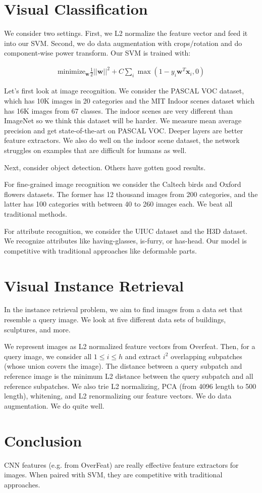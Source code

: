 \documentclass[a4paper]{article}
\begin{document}
\section{Visual Classification}
We consider two settings. First, we L2 normalize the feature vector and feed
it into our SVM. Second, we do data augmentation with crops/rotation and
do component-wise power transform. Our SVM is trained with:

\begin{align}
  \text{minimize}_{\bm{w}}{\frac{1}{2} ||\bm{w}||^2
  + C \sum_{i}{\max(1 - y_i \bm{w}^T \bm{x}_i, 0)}}
\end{align}

Let's first look at image recognition. We consider the PASCAL VOC dataset, which
has 10K images in 20 categories
and the MIT Indoor scenes dataset which has 16K images from 67 classes. The
indoor scenes are very different than ImageNet so we think this dataset will be
harder. We measure mean average precision and get state-of-the-art on PASCAL
VOC. Deeper layers are better feature extractors. We also do well on the indoor
scene dataset, the network struggles on examples that are difficult for humans
as well.

Next, consider object detection. Others have gotten good results.

For fine-grained image recognition we consider the Caltech birds and Oxford
flowers datasets. The former has 12 thousand images from 200 categories, and the
latter has 100 categories with between 40 to 260 images each. We beat all
traditional methods.

For attribute recognition, we consider the UIUC dataset and the H3D dataset. We
recognize attributes like having-glasses, is-furry, or has-head.
Our model is competitive with traditional approaches like deformable parts.

\section{Visual Instance Retrieval}
In the instance retrieval problem, we aim to find images from a data set that
resemble a query image. We look at five different data sets of buildings,
sculptures, and more.

We represent images as L2 normalized feature vectors from Overfeat. Then,
for a query image, we consider all $1 \leq i \leq h$ and extract $i^2$
overlapping subpatches (whose union covers the image). The distance between
a query subpatch and reference image is the minimum L2 distance between the
query subpatch and all reference subpatches. We also trie
L2 normalizing, PCA (from 4096 length to 500 length), whitening, and L2
renormalizing our feature vectors. We do data augmentation. We do quite well.

\section{Conclusion}
CNN features (e.g. from OverFeat) are really effective feature extractors for
images. When paired with SVM, they are competitive with traditional approaches.
\end{document}
